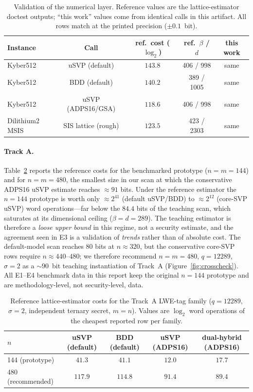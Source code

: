 \documentclass[11pt]{article}
\begin{document}
\begin{table}[h]
\centering
\small
\setlength{\tabcolsep}{3pt}
\caption{Validation of the numerical layer.  Reference values are the
lattice-estimator doctest outputs; ``this work'' values come from identical
calls in this artifact.  All rows match at the printed precision
($\pm0.1$~bit).}
\label{tab:xcheck-validation}
\begin{tabular}{lcccc}
\toprule
Instance & Call & ref.\ cost ($\log_2$) & ref.\ $\beta$ / $d$ & this work \\
\midrule
Kyber512       & uSVP (default)        & $143.8$ & 406 / 998  & same \\
Kyber512       & BDD (default)         & $140.2$ & 389 / 1005 & same \\
Kyber512       & uSVP (ADPS16/GSA)     & $118.6$ & 406 / 998  & same \\
Dilithium2 MSIS & SIS lattice (rough)  & $123.5$ & 423 / 2303 & same \\
\bottomrule
\end{tabular}
\end{table}

\paragraph{Track A.} Table~\ref{tab:xcheck-tracka} reports the reference
costs for the benchmarked prototype ($n=m=144$) and for $n=m=480$, the
smallest size in our scan at which the conservative ADPS16 uSVP estimate
reaches $\approx 91$ bits.  Under the reference estimator the $n=144$
prototype is worth only $\approx 2^{41}$ (default uSVP/BDD) to $\approx 2^{12}$
(core-SVP uSVP) word operations---far below the $84.4$ bits of the teaching
scan, which saturates at its dimensional ceiling ($\beta=d=289$).  The
teaching estimator is therefore a \emph{loose upper bound} in this regime, not
a security estimate, and the agreement seen in E3 is a validation of
\emph{trends} rather than of absolute cost.  The default-model scan reaches 80
bits at $n\approx 320$, but the conservative core-SVP rows require
$n\approx 440$--$480$; we therefore recommend $n=m=480$, $q=12289$,
$\sigma=2$ as a ${\sim}90$~bit teaching instantiation of Track~A
(Figure~\ref{fig:crosscheck}).  All E1--E4 benchmark data in this report keep
the original $n=144$ prototype and are methodology-level, not
security-level, data.

\begin{table}[h]
\centering
\small
\setlength{\tabcolsep}{3pt}
\caption{Reference lattice-estimator costs for the Track~A LWE-tag family
($q=12289$, $\sigma=2$, independent ternary secret, $m=n$).  Values are
$\log_2$ word operations of the cheapest reported row per family.}
\label{tab:xcheck-tracka}
\begin{tabular}{lcccc}
\toprule
$n$ & uSVP (default) & BDD (default) & uSVP (ADPS16) & dual-hybrid (ADPS16) \\
\midrule
144 (prototype)   & $41.3$ & $41.1$ & $12.0$ & $17.7$ \\
480 (recommended) & $117.9$ & $114.8$ & $91.4$ & $89.4$ \\
\bottomrule
\end{tabular}
\end{table}
\end{document}
